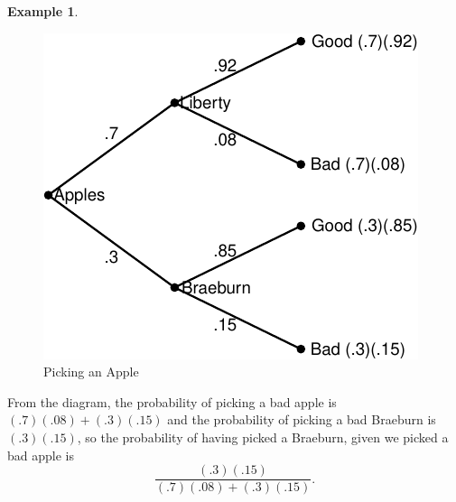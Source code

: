 \documentclass[
]{book}
\theoremstyle{definition}
\theoremstyle{definition}
\newtheorem{example}{Example}[chapter]
\theoremstyle{definition}
\theoremstyle{definition}
\theoremstyle{remark}
\begin{document}
\begin{example}
\begin{figure}
\centering
\includegraphics{math340-notes_files/figure-latex/bayes-apple-1.pdf}
\caption{\label{fig:bayes-apple}Picking an Apple}
\end{figure}

From the diagram, the probability of picking a bad apple is \((.7)(.08) + (.3)(.15)\) and the probability of picking a bad Braeburn is \((.3)(.15)\), so the probability of having picked a Braeburn, given we picked a bad apple is \[\frac{(.3)(.15)}{(.7)(.08) + (.3)(.15)}.\]
\end{example}
\end{document}

